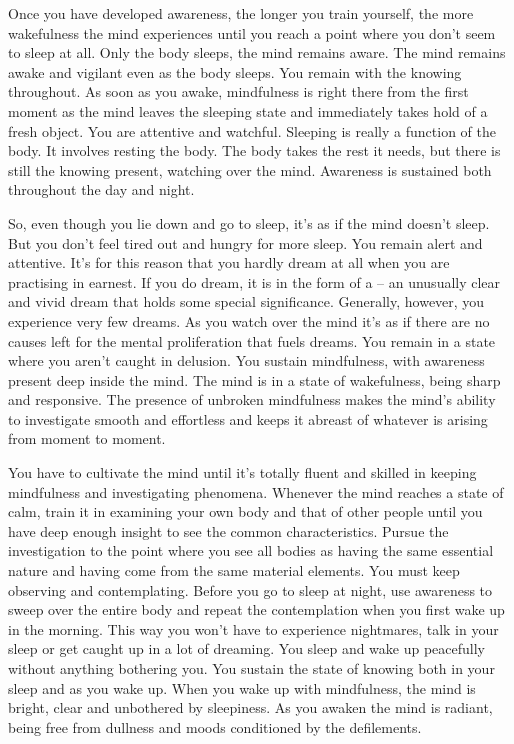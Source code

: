 Once you have developed awareness, the longer you train yourself, the more wakefulness the mind experiences until you reach a point where you don't seem to sleep at all. Only the body sleeps, the mind remains aware. The mind remains awake and vigilant even as the body sleeps. You remain with the knowing throughout. As soon as you awake, mindfulness is right there from the first moment as the mind leaves the sleeping state and immediately takes hold of a fresh object. You are attentive and watchful. Sleeping is really a function of the body. It involves resting the body. The body takes the rest it needs, but there is still the knowing present, watching over the mind. Awareness is sustained both throughout the day and night.

So, even though you lie down and go to sleep, it's as if the mind doesn't sleep. But you don't feel tired out and hungry for more sleep. You remain alert and attentive. It's for this reason that you hardly dream at all when you are practising in earnest. If you do dream, it is in the form of a  -- an unusually clear and vivid dream that holds some special significance. Generally, however, you experience very few dreams. As you watch over the mind it's as if there are no causes left for the mental proliferation that fuels dreams. You remain in a state where you aren't caught in delusion. You sustain mindfulness, with awareness present deep inside the mind. The mind is in a state of wakefulness, being sharp and responsive. The presence of unbroken mindfulness makes the mind's ability to investigate smooth and effortless and keeps it abreast of whatever is arising from moment to moment.

You have to cultivate the mind until it's totally fluent and skilled in keeping mindfulness and investigating phenomena. Whenever the mind reaches a state of calm, train it in examining your own body and that of other people until you have deep enough insight to see the common characteristics. Pursue the investigation to the point where you see all bodies as having the same essential nature and having come from the same material elements. You must keep observing and contemplating. Before you go to sleep at night, use awareness to sweep over the entire body and repeat the contemplation when you first wake up in the morning. This way you won't have to experience nightmares, talk in your sleep or get caught up in a lot of dreaming. You sleep and wake up peacefully without anything bothering you. You sustain the state of knowing both in your sleep and as you wake up. When you wake up with mindfulness, the mind is bright, clear and unbothered by sleepiness. As you awaken the mind is radiant, being free from dullness and moods conditioned by the defilements.

